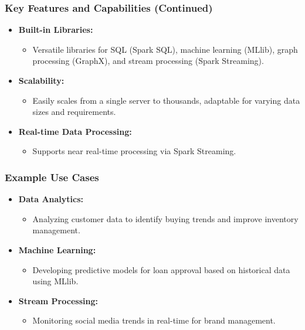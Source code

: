 \documentclass[aspectratio=169]{beamer}
\begin{document}
\begin{frame}[fragile]
    \frametitle{Key Features and Capabilities (Continued)}
    \begin{itemize}
        \item \textbf{Built-in Libraries:}
            \begin{itemize}
                \item Versatile libraries for SQL (Spark SQL), machine learning (MLlib), graph processing (GraphX), and stream processing (Spark Streaming).
            \end{itemize}
        \item \textbf{Scalability:}
            \begin{itemize}
                \item Easily scales from a single server to thousands, adaptable for varying data sizes and requirements.
            \end{itemize}
        \item \textbf{Real-time Data Processing:}
            \begin{itemize}
                \item Supports near real-time processing via Spark Streaming.
            \end{itemize}
    \end{itemize}
\end{frame}

\begin{frame}[fragile]
    \frametitle{Example Use Cases}
    \begin{itemize}
        \item \textbf{Data Analytics:} 
            \begin{itemize}
                \item Analyzing customer data to identify buying trends and improve inventory management.
            \end{itemize}
        \item \textbf{Machine Learning:} 
            \begin{itemize}
                \item Developing predictive models for loan approval based on historical data using MLlib.
            \end{itemize}
        \item \textbf{Stream Processing:} 
            \begin{itemize}
                \item Monitoring social media trends in real-time for brand management.
            \end{itemize}
    \end{itemize}
\end{frame}
\end{document}

